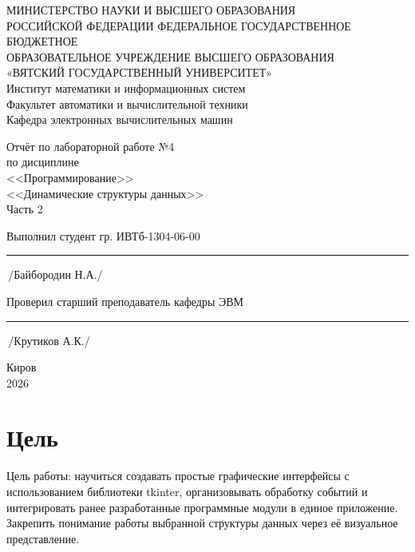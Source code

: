 \documentclass[oneside,a4paper,14pt]{extarticle} %
\begin{document}
    \newpage\thispagestyle{empty}
    \begin{center}
        МИНИСТЕРСТВО НАУКИ И ВЫСШЕГО ОБРАЗОВАНИЯ\\
            РОССИЙСКОЙ ФЕДЕРАЦИИ
            ФЕДЕРАЛЬНОЕ ГОСУДАРСТВЕННОЕ БЮДЖЕТНОЕ\\
            ОБРАЗОВАТЕЛЬНОЕ
            УЧРЕЖДЕНИЕ ВЫСШЕГО ОБРАЗОВАНИЯ\\
            «ВЯТСКИЙ ГОСУДАРСТВЕННЫЙ УНИВЕРСИТЕТ»\\
            Институт математики и информационных систем\\
            Факультет автоматики и вычислительной техники\\
            Кафедра электронных вычислительных машин
    \end{center}
    \vspace{20mm}
    
    \begin{center}
        Отчёт по лабораторной работе №4\\
        по дисциплине\\
        <<Программирование>>\\
        <<Динамические структуры данных>>\\
        Часть 2\\
    \end{center}
    \vspace{48mm}
    
    Выполнил студент гр. ИВТб-1304-06-00 \hspace{2mm} \rule[-0,5mm]{17mm}{0.15mm}\,/Байбородин Н.А./
    
    
    Проверил старший преподаватель кафедры ЭВМ \hspace{2mm} \rule[-0,5mm]{17mm}{0.15mm}\,/Крутиков А.К./
    
    \vfill
    \begin{center}
        Киров\\
        2026
    \end{center}

    \newpage\thispagestyle{empty}

\section{Цель}
Цель работы: научиться создавать простые графические интерфейсы с использованием библиотеки tkinter, организовывать обработку событий и интегрировать ранее разработанные программные модули в единое приложение. Закрепить понимание работы выбранной структуры данных через её визуальное представление.
\end{document}

